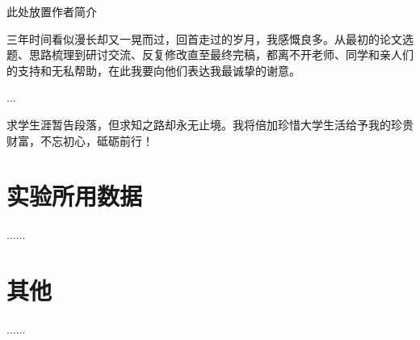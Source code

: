 \documentclass[twoside,a4paper,12pt]{book}%
\begin{document}
\jluPrintReference



\begin{jluSelfIntroduction}
此处放置作者简介
\end{jluSelfIntroduction}



\begin{jluAcknowledgment}
三年时间看似漫长却又一晃而过，回首走过的岁月，我感慨良多。从最初的论文选题、思路梳理到研讨交流、反复修改直至最终完稿，都离不开老师、同学和亲人们的支持和无私帮助，在此我要向他们表达我最诚挚的谢意。

...

求学生涯暂告段落，但求知之路却永无止境。我将倍加珍惜大学生活给予我的珍贵财富，不忘初心，砥砺前行！
\end{jluAcknowledgment}

\appendix
\begin{appendices}
	\chapter{实验所用数据}
	......
	\chapter{其他}
	......
\end{appendices}
\end{document}
